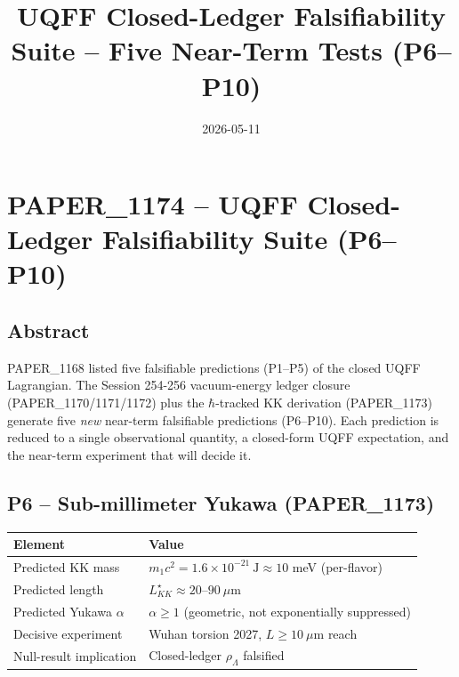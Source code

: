 \documentclass[
]{article}
\title{UQFF Closed-Ledger Falsifiability Suite -- Five Near-Term Tests
(P6--P10)}
\author{}
\date{2026-05-11}
\newcounter{none} %
\begin{document}
\maketitle

\section{PAPER\_1174 -- UQFF Closed-Ledger Falsifiability Suite
(P6--P10)}\label{paper_1174-uqff-closed-ledger-falsifiability-suite-p6p10}

\subsection{Abstract}\label{abstract}

PAPER\_1168 listed five falsifiable predictions (P1--P5) of the closed
UQFF Lagrangian. The Session 254-256 vacuum-energy ledger closure
(PAPER\_1170/1171/1172) plus the \(\hbar\)-tracked KK derivation
(PAPER\_1173) generate five \emph{new} near-term falsifiable predictions
(P6--P10). Each prediction is reduced to a single observational
quantity, a closed-form UQFF expectation, and the near-term experiment
that will decide it.

\subsection{P6 -- Sub-millimeter Yukawa
(PAPER\_1173)}\label{p6-sub-millimeter-yukawa-paper_1173}

{\def\LTcaptype{none} %
\begin{longtable}[]{@{}
  >{\raggedright\arraybackslash}p{}
  >{\raggedright\arraybackslash}p{}@{}}
\toprule\noalign{}
\begin{minipage}[b]{\linewidth}\raggedright
Element
\end{minipage} & \begin{minipage}[b]{\linewidth}\raggedright
Value
\end{minipage} \\
\midrule\noalign{}
\endhead
\bottomrule\noalign{}
\endlastfoot
Predicted KK mass &
\(m_1 c^2 = 1.6\times 10^{-21}\ \mathrm{J} \approx 10\) meV
(per-flavor) \\
Predicted length & \(L_{KK}^\star \approx 20\)--\(90\ \mu\mathrm{m}\) \\
Predicted Yukawa \(\alpha\) & \(\alpha\geq 1\) (geometric, not
exponentially suppressed) \\
Decisive experiment & Wuhan torsion 2027, \(L\geq 10\ \mu\mathrm{m}\)
reach \\
Null-result implication & Closed-ledger \(\rho_\Lambda\) falsified \\
\end{longtable}
}
\end{document}
